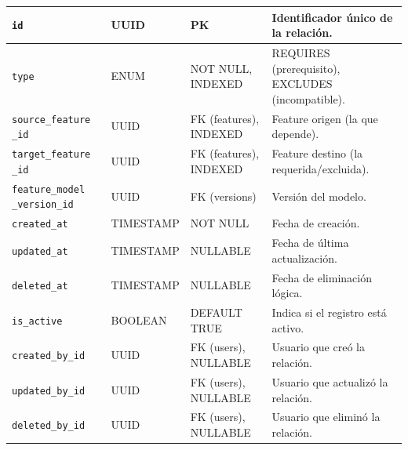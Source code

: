 {{{\begin{longtable}{|p{}|p{}|p{}|p{}|}
                \hline
                \endlastfoot
                
                \texttt{id} & UUID & PK & Identificador único de la relación. \\
                \hline
                \rowcolor[HTML]{EDEBF1}
                \texttt{type} & ENUM & NOT NULL, INDEXED & REQUIRES (prerequisito), EXCLUDES (incompatible). \\
                \hline
                \texttt{source\_feature 
                \_id} & UUID & FK (features), INDEXED & Feature origen (la que depende). \\
                \hline
                \rowcolor[HTML]{EDEBF1}
                \texttt{target\_feature 
                \_id} & UUID & FK (features), INDEXED & Feature destino (la requerida/excluida). \\
                \hline
                \texttt{feature\_model 
                \_version\_id} & UUID & FK (versions) & Versión del modelo. \\
                \hline
                \rowcolor[HTML]{EDEBF1}
                \texttt{created\_at} & TIMESTAMP & NOT NULL & Fecha de creación. \\
                \hline
                \texttt{updated\_at} & TIMESTAMP & NULLABLE & Fecha de última actualización. \\
                \hline
                \rowcolor[HTML]{EDEBF1}
                \texttt{deleted\_at} & TIMESTAMP & NULLABLE & Fecha de eliminación lógica. \\
                \hline
                \texttt{is\_active} & BOOLEAN & DEFAULT TRUE & Indica si el registro está activo. \\
                \hline
                \rowcolor[HTML]{EDEBF1}
                \texttt{created\_by\_id} & UUID & FK (users), NULLABLE & Usuario que creó la relación. \\
                \hline
                \texttt{updated\_by\_id} & UUID & FK (users), NULLABLE & Usuario que actualizó la relación. \\
                \hline
                \rowcolor[HTML]{EDEBF1}
                \texttt{deleted\_by\_id} & UUID & FK (users), NULLABLE & Usuario que eliminó la relación. \\
                \hline
            \end{longtable}

}}}
